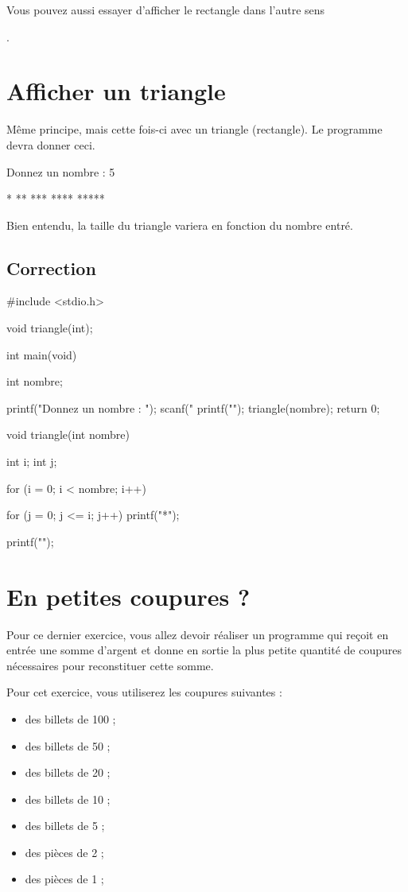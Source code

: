 \begin{infobox}
  Vous pouvez aussi essayer d'afficher
le rectangle dans l'autre sens
\end{infobox}
.

\section{Afficher un triangle}
\label{afficher-un-triangle}

Même principe, mais cette fois-ci avec un triangle (rectangle). Le
programme devra donner ceci.

\begin{C}
Donnez un nombre : 5

*
**
***
****
*****
\end{C}

Bien entendu, la taille du triangle variera en fonction du nombre entré.

\subsection{Correction}
\label{correction-11}

\begin{C}
 #include <stdio.h>

void triangle(int);


int main(void)
{
    int nombre;

    printf("Donnez un nombre : ");
    scanf("%
    printf("\n");
    triangle(nombre);
    return 0;
}

void triangle(int nombre)
{
    int i;
    int j;

    for (i = 0; i < nombre; i++)
    {
        for (j = 0; j <= i; j++)
            printf("*");

        printf("\n");
    }
}
\end{C}

\section{En petites coupures ?}
\label{en-petites-coupures}

Pour ce dernier exercice, vous allez devoir réaliser un programme qui
reçoit en entrée une somme d'argent et donne en sortie la plus petite
quantité de coupures nécessaires pour reconstituer cette somme.

Pour cet exercice, vous utiliserez les coupures suivantes :

\begin{itemize}
\item
  des billets de 100\texteuro{} ;
\item
  des billets de 50\texteuro{} ;
\item
  des billets de 20\texteuro{} ;
\item
  des billets de 10\texteuro{} ;
\item
  des billets de 5\texteuro{} ;
\item
  des pièces de 2\texteuro{} ;
\item
  des pièces de 1\texteuro{} ;
\end{itemize}

